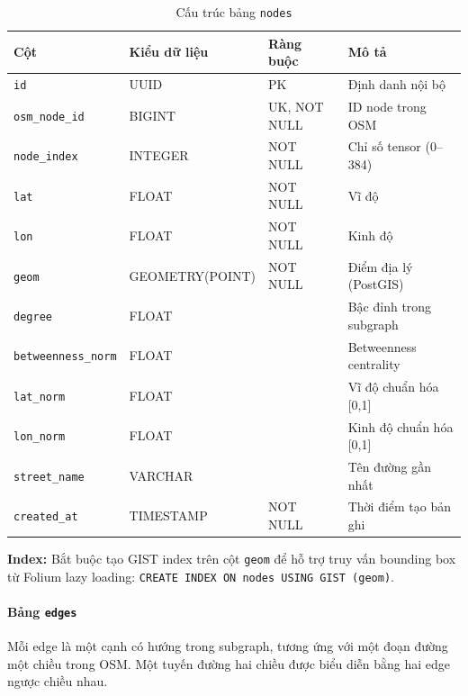 \begin{table}[H]
\centering
\caption{Cấu trúc bảng \texttt{nodes}}
\begin{tabular}{|l|l|l|p{5cm}|}
\hline
\textbf{Cột} & \textbf{Kiểu dữ liệu} & \textbf{Ràng buộc} & \textbf{Mô tả} \\
\hline
\texttt{id} & UUID & PK & Định danh nội bộ \\
\texttt{osm\_node\_id} & BIGINT & UK, NOT NULL & ID node trong OSM \\
\texttt{node\_index} & INTEGER & NOT NULL & Chỉ số tensor (0--384) \\
\texttt{lat} & FLOAT & NOT NULL & Vĩ độ \\
\texttt{lon} & FLOAT & NOT NULL & Kinh độ \\
\texttt{geom} & GEOMETRY(POINT) & NOT NULL & Điểm địa lý (PostGIS) \\
\texttt{degree} & FLOAT & & Bậc đỉnh trong subgraph \\
\texttt{betweenness\_norm} & FLOAT & & Betweenness centrality \\
\texttt{lat\_norm} & FLOAT & & Vĩ độ chuẩn hóa [0,1] \\
\texttt{lon\_norm} & FLOAT & & Kinh độ chuẩn hóa [0,1] \\
\texttt{street\_name} & VARCHAR & & Tên đường gần nhất \\
\texttt{created\_at} & TIMESTAMP & NOT NULL & Thời điểm tạo bản ghi \\
\hline
\end{tabular}
\end{table}

\textbf{Index:} Bắt buộc tạo GIST index trên cột \texttt{geom} để hỗ trợ truy vấn bounding box từ Folium lazy loading: \texttt{CREATE INDEX ON nodes USING GIST (geom)}.

\paragraph{Bảng \texttt{edges}}
Mỗi edge là một cạnh có hướng trong subgraph, tương ứng với một đoạn đường một chiều trong OSM. Một tuyến đường hai chiều được biểu diễn bằng hai edge ngược chiều nhau.

